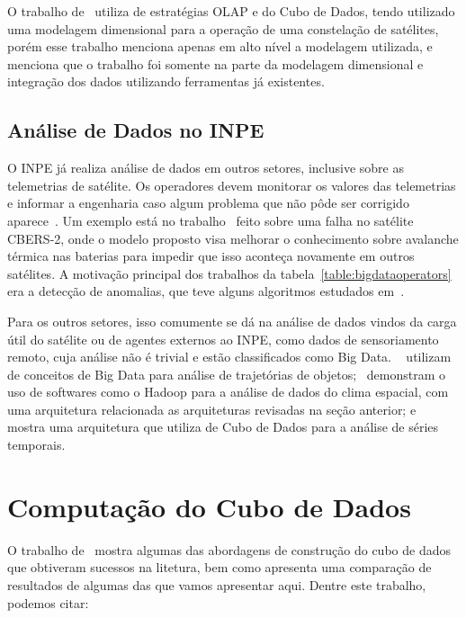 O trabalho de~\cite{yvernesCopernicusGroundSegment2018} utiliza de estratégias OLAP e do Cubo de Dados, tendo utilizado uma modelagem dimensional para a operação de uma constelação de satélites, porém esse trabalho menciona apenas em alto nível a modelagem utilizada, e menciona que o trabalho foi somente na parte da modelagem dimensional e integração dos dados utilizando ferramentas já existentes.

\subsection{Análise de Dados no INPE}
\label{ch:corr:inpe}

O INPE já realiza análise de dados em outros setores, inclusive sobre as telemetrias de satélite.
Os operadores devem monitorar os valores das telemetrias e informar a engenharia caso algum problema que não pôde ser corrigido aparece~\cite{TominagaFerrAmbr:2017:CoSaTe}.
Um exemplo está no trabalho~\cite{Magalhaes:2012:EsAvTe} feito sobre uma falha no satélite CBERS-2, onde o modelo proposto visa melhorar o conhecimento sobre avalanche térmica nas baterias para impedir que isso aconteça novamente em outros satélites.
A motivação principal dos trabalhos da tabela~\ref{table:bigdataoperators} era a detecção de anomalias, que teve alguns algoritmos estudados em~\cite{AzevedoAmbrViei::EsSoTe}.

Para os outros setores, isso comumente se dá na análise de dados vindos da carga útil do satélite ou de agentes externos ao INPE, como dados de sensoriamento remoto, cuja análise não é trivial e estão classificados como Big Data.
~\cite{monteiroFRAMEWORKTRAJECTORYDATA2017} utilizam de conceitos de Big Data para análise de trajetórias de objetos;~\cite{ramosDistributedSystemsPerformance2016} demonstram o uso de softwares como o Hadoop para a análise de dados do clima espacial, com uma arquitetura relacionada as arquiteturas revisadas na seção anterior; e~\cite{SimoesCamaQuei:2018:DaAnMa} mostra uma arquitetura que utiliza de Cubo de Dados para a análise de séries temporais.

\section{Computação do Cubo de Dados}
\label{ch:corr:cube}

O trabalho de~\cite{silva:2015:abordagensParaCubo} mostra algumas das abordagens de construção do cubo de dados que obtiveram sucessos na litetura, bem como apresenta uma comparação de resultados de algumas das que vamos apresentar aqui. Dentre este trabalho, podemos citar:

